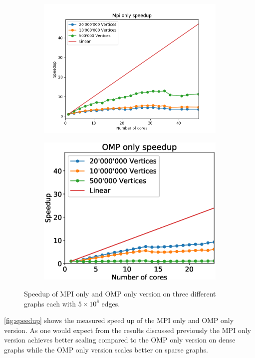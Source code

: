 
\begin{figure}
\begin{subfigure}[c]{0.23\textwidth}
\includegraphics[width=\textwidth]{plots/mpi_speedup_with_ref}
\label{fig:speedup_mpi}
\end{subfigure}
\begin{subfigure}[c]{0.23\textwidth}
\includegraphics[width=\textwidth]{plots/omp_speedup_with_ref}
\label{fig:speedup_omp}
\end{subfigure}
\caption{Speedup of MPI only and OMP only version on three different graphs each with $5\times10^{8}$ edges.}
\label{fig:speedup}
\end{figure}

\autoref{fig:speedup} shows the measured speed up of the MPI only and OMP only version. As one would expect from the results discussed previously the MPI only version achieves better scaling compared to the OMP only version on dense graphs while the OMP only version scales better on sparse graphs.

